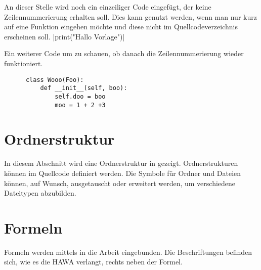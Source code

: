 An dieser Stelle wird noch ein einzeiliger Code eingefügt, der keine Zeilennummerierung erhalten soll.
Dies kann genutzt werden, wenn man nur kurz auf eine Funktion eingehen möchte und diese nicht im Quellcodeverzeichnis erscheinen soll.
|print("Hallo Vorlage")|

Ein weiterer Code um zu schauen, ob danach die Zeilennummerierung wieder funktioniert.

\begin{code}
  \begin{verbatim}
      class Wooo(Foo):
          def __init__(self, boo):
              self.doo = boo
              moo = 1 + 2 +3
  \end{verbatim}
  \label{code:example2}
\end{code}
\section{Ordnerstruktur}
    In diesem Abschnitt wird eine Ordnerstruktur in  gezeigt.
    Ordnerstrukturen können im Quellcode definiert werden.
    Die Symbole für Ordner und Dateien können, auf Wunsch, ausgetauscht oder erweitert werden, um verschiedene Dateitypen abzubilden.

    \section{Formeln}
    Formeln werden mittels  in die Arbeit eingebunden.
    Die Beschriftungen befinden sich, wie es die HAWA verlangt, rechts neben der Formel.

